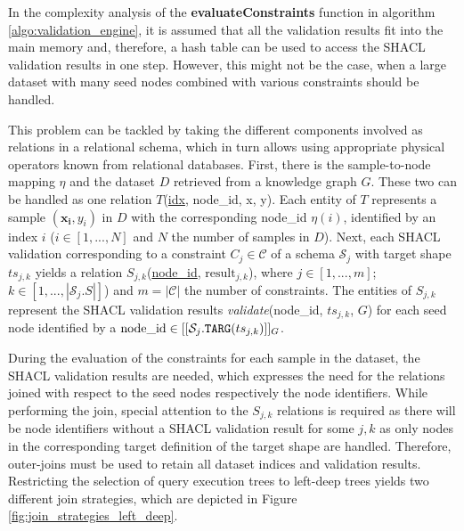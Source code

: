 In the complexity analysis of the \textbf{evaluateConstraints} function in algorithm \ref{algo:validation_engine}, it is assumed that all the validation results fit into the main memory and, therefore, a hash table can be used to access the SHACL validation results in one step. However, this might not be the case, when a large dataset with many seed nodes combined with various constraints should be handled. 

This problem can be tackled by taking the different components involved as relations in a relational schema, which in turn allows using appropriate physical operators known from relational databases. First, there is the sample-to-node mapping $\eta$ and the dataset $D$ retrieved from a knowledge graph $G$. These two can be handled as one relation $T$(\underline{idx}, node\_id, x, y). Each entity of $T$ represents a sample $(\mathbf{x_i},y_i)$ in $D$ with the corresponding node\_id $\eta(i)$, identified by an index $i$ ($i \in [1,...,N]$ and $N$ the number of samples in $D$). Next, each SHACL validation corresponding to a constraint $C_j \in \mathcal{C}$ of a schema $\mathcal{S}_j$ with target shape $ts_{j,k}$ yields a relation $S_{j,k}$(\underline{node\_id}, $\textrm{result}_{j,k}$), where $j \in [1,...,m]$; $k \in [1,...,|\mathcal{S}_j.S|]$) and $m = |\mathcal{C}|$ the number of constraints. The entities of $S_{j,k}$ represent the SHACL validation results \textit{validate}(node\_id, $ts_{j,k}$, $G$) for each seed node identified by a $\textrm{node\_id} \in [[\mathcal{S}_j.\texttt{TARG}(ts_{j,k})]]_G$.

During the evaluation of the constraints for each sample in the dataset, the SHACL validation results are needed, which expresses the need for the relations joined with respect to the seed nodes respectively the node identifiers. While performing the join, special attention to the $S_{j,k}$ relations is required as there will be node identifiers without a SHACL validation result for some $j,k$ as only nodes in the corresponding target definition of the target shape are handled. Therefore, outer-joins must be used to retain all dataset indices and validation results. Restricting the selection of query execution trees to left-deep trees yields two different join strategies, which are depicted in Figure \ref{fig:join_strategies_left_deep}.

